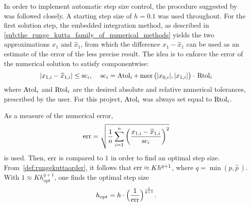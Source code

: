 In order to implement automatic step size control, the procedure suggested
by \textcite[pp.167--168]{hairer1993solving} was followed
closely. A starting step size of $h=0.1$ was used throughout. For the first
solution step, the embedded integration method, as described in
\cref{sub:the_runge_kutta_family_of_numerical_methods} yields the two
approximations $x_{1}$ and $\widehat{x}_{1}$, from which the difference
$x_{1}-\widehat{x}_{1}$ can be used as an estimate of the error of the less
precise result. The idea is to enforce the error of the numerical solution to
satisfy componentwise:
\begin{equation}
    \label{eq:embeddederror}
    \abs{x_{1,i}-\widehat{x}_{1,i}} \leq \scem_{i},\quad{}%
    \scem_{i}=\atol_{i}+\max\big(\abs{x_{0,i}},\abs{x_{1,i}}\big)\cdot{}\rtol_{i}
\end{equation}
where $\operatorname{Atol}_{i}$ and $\operatorname{Rtol}_{i}$ are the desired absolute and relative
numerical tolerances, prescribed by the user. For this project, $\operatorname{Atol}_{i}$ was
always set equal to $\operatorname{Rtol}_{i}$.

As a measure of the numerical error,
\begin{equation}
    \label{eq:embeddednumericalerror}
    \errem = \sqrt{\frac{1}{n}\sum\limits_{i=1}^{n}%
    {\bigg(\frac{x_{1,i}-\widehat{x}_{1,i}}{\scem_{i}}\bigg)}^{2}}
\end{equation}
is used. Then, $\operatorname{err}$ is compared to $1$ in order to find an optimal step
size. From~\cref{def:rungekuttaorder}, it follows that $\operatorname{err}\approx{}Kh^{q+1}$,
where $q=\min(p,\widehat{p}\,)$. With $1\approx{}Kh_{\mathrm{opt}}^{q+1}$,
one finds the optimal step size
\begin{equation}
    \label{eq:embeddedoptimalstepsize}
    h_{\mathrm{opt}}=h\cdot\Big(\frac{1}{\operatorname{err}}\Big)^{\frac{1}{q+1}}.
\end{equation}

